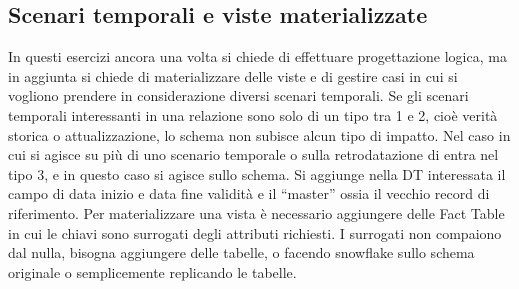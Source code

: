 \subsection{Scenari temporali e viste materializzate}
In questi esercizi ancora una volta si chiede di effettuare progettazione logica, ma in aggiunta si chiede di materializzare delle viste e di gestire casi in cui si vogliono prendere in considerazione diversi scenari temporali. Se gli scenari temporali interessanti in una relazione sono solo di un tipo tra 1 e 2, cioè verità storica o attualizzazione, lo schema non subisce alcun tipo di impatto. Nel caso in cui si agisce su più di uno scenario temporale o sulla retrodatazione di entra nel tipo 3, e in questo caso si agisce sullo schema. Si aggiunge nella DT interessata il campo di data inizio e data fine validità e il “master” ossia il vecchio record di riferimento. Per materializzare una vista è necessario aggiungere delle Fact Table in cui le chiavi sono surrogati degli attributi richiesti. I surrogati non compaiono dal nulla, bisogna aggiungere delle tabelle, o facendo snowflake sullo schema originale o semplicemente replicando le tabelle.
\newpage
